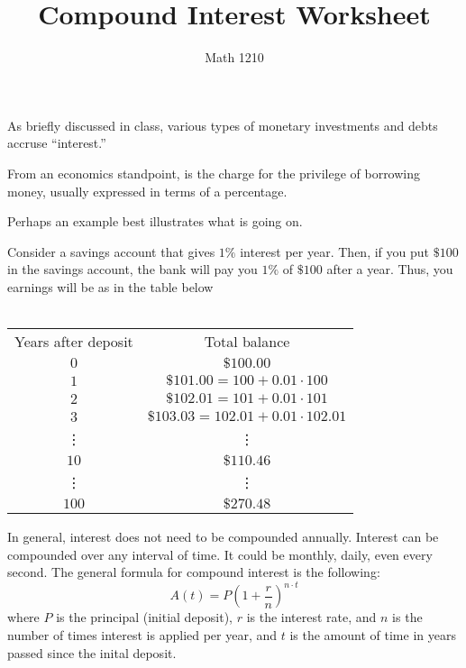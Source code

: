 \documentclass[12pt]{article}
\author{Math 1210}
\title{Compound Interest Worksheet}
\theoremstyle{mainstyle} %
\begin{document}
\maketitle
As briefly discussed in class, various types of monetary investments
and debts accruse ``interest.''
\begin{defn}
  From an economics standpoint, 
is the charge for the privilege of borrowing money, usually expressed
in terms of a percentage.
\end{defn}
Perhaps an example best illustrates what is going on.
\begin{example}
  Consider a savings account that gives \(1\%\) interest per
  year. Then, if you put \(\$100\) in the savings account, the bank
  will pay you \(1\%\) of \(\$100\) after a year. Thus, you earnings
  will be as in the table below \\ \\
  \begin{tabular}{|c|c|}
    Years after deposit&Total balance \\
    \(0\) & \(\$100.00\) \\
    \(1\) & \(\$101.00 = 100 + 0.01 \cdot 100\) \\
    \(2\) & \(\$102.01 = 101 + 0.01 \cdot 101\) \\
    \(3\) & \(\$103.03 = 102.01 + 0.01 \cdot 102.01\) \\
    \vdots & \vdots \\
    \(10\) & \(\$110.46\) \\
    \vdots & \vdots \\
    \(100\) & \(\$270.48\)
  \end{tabular}
\end{example}
In general, interest does not need to be compounded annually. Interest
can be compounded over any interval of time. It could be monthly,
daily, even every second. The general formula for compound interest is
the following: \[
  A(t) = P \left( 1+\frac{r}{n} \right)^{n\cdot t}
\]
where \(P\) is the principal (initial deposit), \(r\) is the interest
rate, and \(n\) is the number of times interest is applied per year,
and \(t\) is the amount of time in years passed since the inital
deposit. \\
\end{document}
